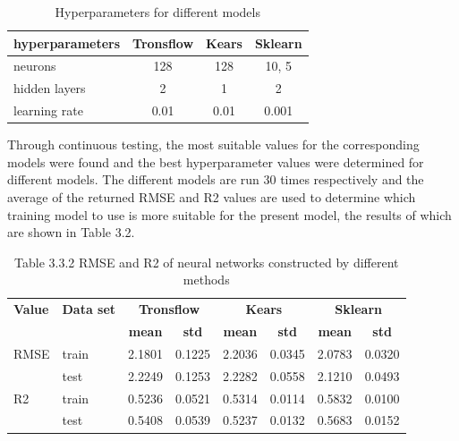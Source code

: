 \documentclass[conference]{IEEEtran}
\begin{document}
\begin{table}[htbp]
    \centering
    \caption{Hyperparameters for different models}
    \begin{tabular}{|l|c|c|c|}
        \hline
        \textbf{hyperparameters} & \textbf{Tronsflow} & \textbf{Kears} & \textbf{Sklearn} \\ \hline
        neurons & 128 & 128 & 10, 5 \\ \hline
        hidden layers & 2 & 1 & 2 \\ \hline
        learning rate & 0.01 & 0.01 & 0.001 \\ \hline
    \end{tabular}
    \label{tab:hyperparameters_models}
\end{table}

Through continuous testing, the most suitable values for the corresponding models were found and the best hyperparameter values were determined for different models.
The different models are run 30 times respectively and the average of the returned RMSE and R2 values are used to determine which training model to use is more suitable for the present model, the results of which are shown in Table 3.2.

\begin{table}[htbp]
    \centering
    \caption{Table 3.3.2 RMSE and R2 of neural networks constructed by different methods}
    \begin{tabular}{llcccccc}
        \toprule
        \textbf{Value} & \textbf{Data set} & \multicolumn{2}{c}{\textbf{Tronsflow}} & \multicolumn{2}{c}{\textbf{Kears}} & \multicolumn{2}{c}{\textbf{Sklearn}} \\ \cmidrule(lr){3-4} \cmidrule(lr){5-6} \cmidrule(lr){7-8}
                       &                   & \textbf{mean} & \textbf{std} & \textbf{mean} & \textbf{std} & \textbf{mean} & \textbf{std} \\ \midrule
        RMSE          & train             & 2.1801 & 0.1225 & 2.2036 & 0.0345 & 2.0783 & 0.0320 \\
                       & test              & 2.2249 & 0.1253 & 2.2282 & 0.0558 & 2.1210 & 0.0493 \\ \midrule
        R2            & train             & 0.5236 & 0.0521 & 0.5314 & 0.0114 & 0.5832 & 0.0100 \\
                       & test              & 0.5408 & 0.0539 & 0.5237 & 0.0132 & 0.5683 & 0.0152 \\
        \bottomrule
    \end{tabular}
    \label{tab:rmse_r2_neural_networks}
\end{table}
\end{document}
